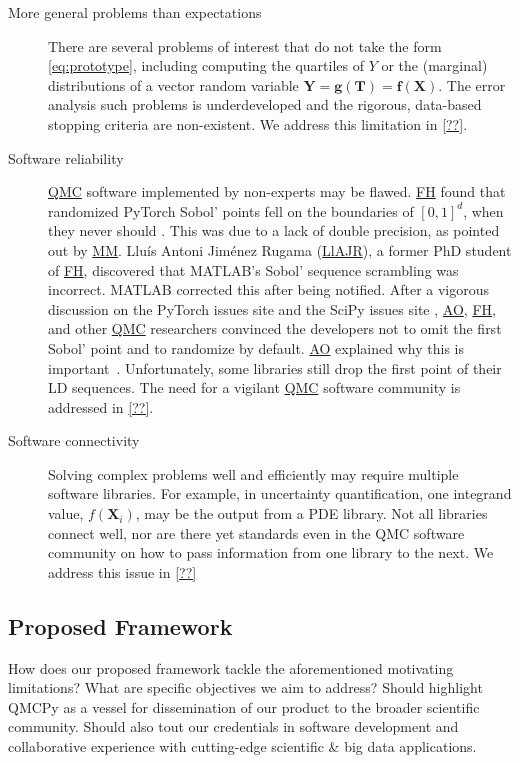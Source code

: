 \documentclass[11pt]{NSFamsart}
\newcommand{\cmtS}[1]{{\color{blue}{(Simon: #1)}}}
\newcommand{\FH}{\hyperlink{FHlink}{FH}\xspace}
\newcommand{\AO}{\hyperlink{AOlink}{AO}\xspace}
\newcommand{\MM}{\hyperlink{MMlink}{MM}\xspace}
\newcommand{\LlAJR}{\hyperlink{LlAJRlink}{LlAJR}\xspace}
\newcommand{\QMC}{\hyperlink{QMClink}{QMC}\xspace}
\newcommand{\SciPy}{SciPy\xspace}
\newcommand{\MATLAB}{MATLAB\xspace}
\newcommand{\PyTorch}{PyTorch\xspace}
\newcommand{\bff}{{\boldsymbol{f}}}
\newcommand{\bT}{{\boldsymbol{T}}}
\newcommand{\bX}{{\boldsymbol{X}}}
\newcommand{\bg}{{\boldsymbol{g}}}
\newcommand{\bY}{{\boldsymbol{Y}}}
\begin{document}
\begin{description}
\item[More general problems than expectations] There are several problems  of interest that do not take the  form \eqref{eq:prototype}, including  computing  the quartiles of $Y$ or the (marginal) distributions of a vector random variable $\bY = \bg(\bT) = \bff(\bX)$.  The error analysis such problems is underdeveloped and the rigorous, data-based stopping criteria are non-existent. We address this limitation in  \cref{??}.

\item[Software reliability] \QMC software implemented by non-experts may be flawed.  \FH found  that randomized \PyTorch Sobol' points fell on the boundaries of $[0,1]^d$, when they never should \cite{PyTorchFirstPt2020a}.  This was due to a lack of double precision, as pointed out by \MM.  \hypertarget{LlAJRlink}{Llu\'is Antoni Jim\'enez Rugama} (\LlAJR), a former PhD student of \FH,  discovered  that \MATLAB's Sobol' sequence scrambling was incorrect.  \MATLAB corrected this after being notified.  After a vigorous discussion on the \PyTorch issues site \cite{PyTorchFirstPt2020a} and the \SciPy issues site \cite{scipySobol2020a}, \AO, \FH, and other \QMC researchers convinced the developers not to omit the first Sobol' point and to randomize by default. \AO explained why this is important~\cite{owen2020dropping}.  Unfortunately, some libraries still drop the first point of their LD sequences.  The need for a vigilant \QMC software community is addressed in  \cref{??}.


\item[Software connectivity] Solving complex problems well and efficiently may require  multiple software libraries.  For example, in uncertainty quantification, one integrand value, $f(\bX_i)$, may be the output from a PDE  library.  Not all libraries connect well, nor are there yet standards even in the QMC software community on how to pass information from one library to the next.  We address this issue in  \cref{??}

\end{description}


\subsection{Proposed Framework} How does our proposed framework tackle the aforementioned motivating limitations? What are specific objectives we aim to address? Should highlight QMCPy as a vessel for dissemination of our product to the broader scientific community. Should also tout our credentials in software development and collaborative experience with cutting-edge scientific \& big data applications. \cmtS{add workflow figure going from applications to tasks.}
\end{document}

